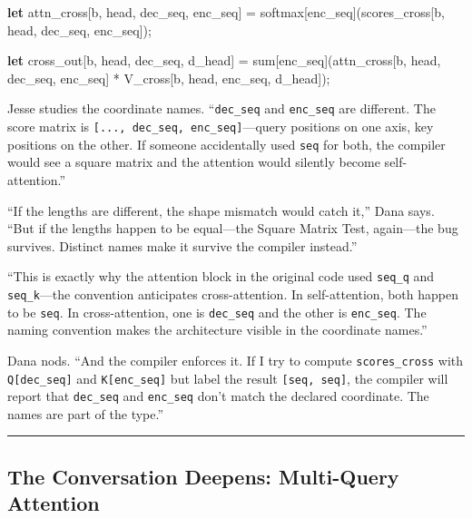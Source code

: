 \documentclass[11pt,]{article}
\newenvironment{Shaded}{}{}
\newcommand{\KeywordTok}[1]{\textcolor[rgb]{0.00,0.44,0.13}{\textbf{#1}}}
\newcommand{\NormalTok}[1]{#1}
\newcommand{\OperatorTok}[1]{\textcolor[rgb]{0.40,0.40,0.40}{#1}}
\begin{document}
\begin{Shaded}
\begin{Highlighting}[]
\KeywordTok{let}\NormalTok{ attn_cross}\OperatorTok{[}\NormalTok{b, head, dec_seq, enc_seq}\OperatorTok{]}\NormalTok{ =}
\NormalTok{    softmax}\OperatorTok{[}\NormalTok{enc_seq}\OperatorTok{]}\NormalTok{(scores_cross}\OperatorTok{[}\NormalTok{b, head, dec_seq, enc_seq}\OperatorTok{]}\NormalTok{);}

\KeywordTok{let}\NormalTok{ cross_out}\OperatorTok{[}\NormalTok{b, head, dec_seq, d_head}\OperatorTok{]}\NormalTok{ =}
\NormalTok{    sum}\OperatorTok{[}\NormalTok{enc_seq}\OperatorTok{]}\NormalTok{(attn_cross}\OperatorTok{[}\NormalTok{b, head, dec_seq, enc_seq}\OperatorTok{]}\NormalTok{ *}
\NormalTok{                  V_cross}\OperatorTok{[}\NormalTok{b, head, enc_seq, d_head}\OperatorTok{]}\NormalTok{);}
\end{Highlighting}
\end{Shaded}

Jesse studies the coordinate names. ``\texttt{dec\_seq} and
\texttt{enc\_seq} are different. The score matrix is
\texttt{{[}...,\ dec\_seq,\ enc\_seq{]}}---query positions on one axis,
key positions on the other. If someone accidentally used \texttt{seq}
for both, the compiler would see a square matrix and the attention would
silently become self-attention.''

``If the lengths are different, the shape mismatch would catch it,''
Dana says. ``But if the lengths happen to be equal---the Square Matrix
Test, again---the bug survives. Distinct names make it survive the
compiler instead.''

``This is exactly why the attention block in the original code used
\texttt{seq\_q} and \texttt{seq\_k}---the convention anticipates
cross-attention. In self-attention, both happen to be \texttt{seq}. In
cross-attention, one is \texttt{dec\_seq} and the other is
\texttt{enc\_seq}. The naming convention makes the architecture visible
in the coordinate names.''

Dana nods. ``And the compiler enforces it. If I try to compute
\texttt{scores\_cross} with \texttt{Q{[}dec\_seq{]}} and
\texttt{K{[}enc\_seq{]}} but label the result \texttt{{[}seq,\ seq{]}},
the compiler will report that \texttt{dec\_seq} and \texttt{enc\_seq}
don't match the declared coordinate. The names are part of the type.''

\begin{center}\rule{0.5\linewidth}{0.4pt}\end{center}

\hypertarget{the-conversation-deepens-multi-query-attention}{%
\subsection{The Conversation Deepens: Multi-Query
Attention}\label{the-conversation-deepens-multi-query-attention}}
\end{document}
